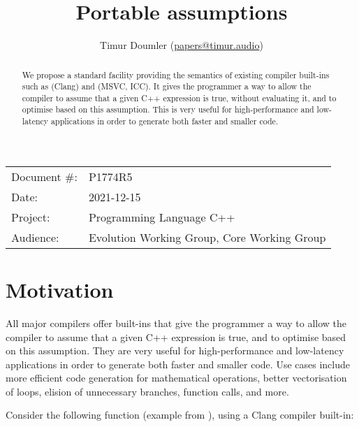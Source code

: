 

\newcommand{\forceindent}{\parindent=1em\indent\parindent=0pt\relax} %


\title{Portable assumptions}
\author{
  Timur Doumler \small(\href{mailto:papers@timur.audio}{papers@timur.audio})
}
\date{}
\maketitle

\begin{tabular}{ll}
Document \#: & P1774R5 \\
Date: & 2021-12-15\\
Project: & Programming Language C++ \\
Audience: & Evolution Working Group, Core Working Group
\end{tabular}


\begin{abstract}
We propose a standard facility providing the semantics of existing compiler built-ins such as  (Clang) and  (MSVC, ICC). It gives the programmer a way to allow the compiler to assume that a given C++ expression is true, without evaluating it, and to optimise based on this assumption. This is very useful for high-performance and low-latency applications in order to generate both faster and smaller code.
\end{abstract}

\vspace{5mm}

\section{Motivation}
\label{sec:motivation}

All major compilers offer built-ins that give the programmer a way to allow the compiler to assume that a given C++ expression is true, and to optimise based on this assumption. They are very useful for high-performance and low-latency applications in order to generate both faster and smaller code. Use cases include more efficient code generation for mathematical operations, better vectorisation of loops, elision of unnecessary branches, function calls, and more.

Consider the following function (example from \cite{Regehr2014}), using a Clang compiler built-in:

